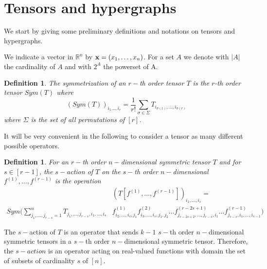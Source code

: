 \documentclass[11pt]{article}
\newtheorem{definition}[theorem]{Definition}
\def\R{\mathbb{R}}
\begin{document}

\section{Tensors and hypergraphs}\label{SecTensHyp}

We start by giving some preliminary definitions and notations on tensors and hypergraphs.\newline 

We indicate a vector in $\R^n$ by ${\bf x}=(x_1,\dots,x_n)$. For a set $A$ we denote with $|A|$ the cardinality of $A$ and with $2^A$ the powerset of A.\newline
\begin{definition}
The \emph{symmetrization} of an  $r-$th order tensor $T$ is the $r$-th order tensor $Sym(T)$ where
$$
(Sym(T))_{i_1\ldots,i_r}=\frac{1}{r!}\sum_{\sigma \in \Sigma}T_{i_{\sigma(1)},\ldots,i_{\sigma(r)}}
$$
where $\Sigma$ is the set of all permutations of $[r]$.
\end{definition}

It will be very convenient in the following to consider a tensor as many different possible operators. 
\begin{definition}\label{DefAction}
For an $r-$th order $n-$dimensional symmetric tensor $T$ and for $s\in [r-1]$, the $s-$action of $T$ on the $s-$th order $n-$dimensional $f^{(1)},\ldots, f^{(r-1)}$ is the operation 
\begin{equation*}
\begin{aligned}
&(T[f^{(1)},\ldots,f^{(r-1)}])_{i_1,\ldots,i_s}=\\
Sym(\sum^n_{j_1,\ldots,j_{r-s}=1}T_{j_1,\ldots,j_{r-s},i_1,\ldots,i_{s}}&f^{(1)}_{i_2,\ldots,i_{s},j_1}f^{(2)}_{i_3,\ldots,i_{s},j_1,j_2}\ldots f^{(r-2s+1)}_{j_{r-2s+2},\ldots,j_{r-s},i_1}\ldots f^{(r-1)}_{j_{r-s},i_1,\ldots,i_{s-1}})
\end{aligned}
\end{equation*}

\end{definition}
The $s-$action of $T$ is an operator that sends $k-1$ $s-$th order $n-$dimensional  symmetric tensors in a $s-$th order $n-$dimensional symmetric tensor. Therefore, the $s-action$ is an operator acting on real-valued functions with domain the set of subsets of cardinality $s$ of $[n]$. 
\end{document}
